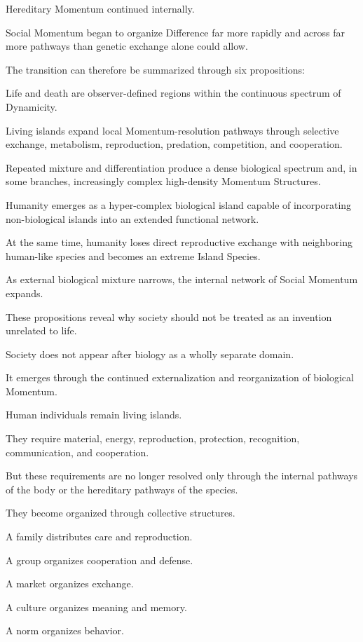 Hereditary Momentum continued internally.

Social Momentum began to organize Difference far more rapidly and across far more pathways than genetic exchange alone could allow.

The transition can therefore be summarized through six propositions:

Life and death are observer-defined regions within the continuous spectrum of Dynamicity.

Living islands expand local Momentum-resolution pathways through selective exchange, metabolism, reproduction, predation, competition, and cooperation.

Repeated mixture and differentiation produce a dense biological spectrum and, in some branches, increasingly complex high-density Momentum Structures.

Humanity emerges as a hyper-complex biological island capable of incorporating non-biological islands into an extended functional network.

At the same time, humanity loses direct reproductive exchange with neighboring human-like species and becomes an extreme Island Species.

As external biological mixture narrows, the internal network of Social Momentum expands.

These propositions reveal why society should not be treated as an invention unrelated to life.

Society does not appear after biology as a wholly separate domain.

It emerges through the continued externalization and reorganization of biological Momentum.

Human individuals remain living islands.

They require material, energy, reproduction, protection, recognition, communication, and cooperation.

But these requirements are no longer resolved only through the internal pathways of the body or the hereditary pathways of the species.

They become organized through collective structures.

A family distributes care and reproduction.

A group organizes cooperation and defense.

A market organizes exchange.

A culture organizes meaning and memory.

A norm organizes behavior.

